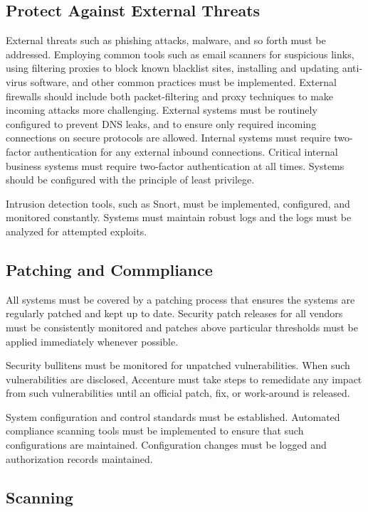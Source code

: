 \subsection{Protect Against External Threats}

External threats such as phishing attacks, malware, and so forth must be addressed. Employing common tools such as email scanners for suspicious links, using filtering proxies to block known blacklist sites, installing and updating anti-virus software, and other common practices must be implemented. External firewalls should include both packet-filtering and proxy techniques to make incoming attacks more challenging. External systems must be routinely configured to prevent DNS leaks, and to ensure only required incoming connections on secure protocols are allowed. Internal systems must require two-factor authentication for any external inbound connections. Critical internal business systems must require two-factor authentication at all times. Systems should be configured with the principle of least privilege. 

Intrusion detection tools, such as Snort, must be implemented, configured, and monitored constantly. Systems must maintain robust logs and the logs must be analyzed for attempted exploits. 

\subsection{Patching and Commpliance}

All systems must be covered by a patching process that ensures the systems are regularly patched and kept up to date. Security patch releases for all vendors must be consistently monitored and patches above particular thresholds must be applied immediately whenever possible.

Security bullitens must be monitored for unpatched vulnerabilities. When such vulnerabilities are disclosed, Accenture must take steps to remedidate any impact from such vulnerabilities until an official patch, fix, or work-around is released.

System configuration and control standards must be established. Automated compliance scanning tools must be implemented to ensure that such configurations are maintained. Configuration changes must be logged and authorization records maintained.

\subsection{Scanning}

